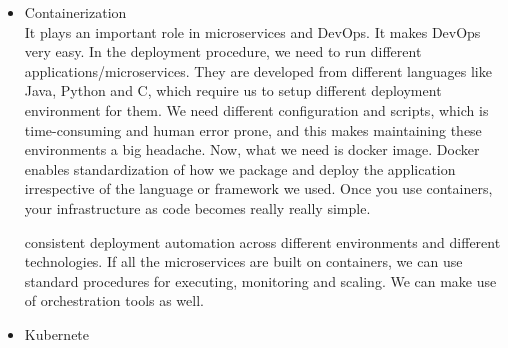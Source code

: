\documentclass{article}
\begin{document}
\begin{itemize}
\item Containerization\\
It plays an important role in microservices and DevOps. It makes DevOps very easy. In the deployment procedure, we need to run different applications/microservices. They are developed from different languages like Java, Python and C, which require us to setup different deployment environment for them. We need different configuration and scripts, which is time-consuming and human error prone, and this makes maintaining these environments a big headache. Now, what we need is docker image. Docker enables standardization of how we package and deploy the application irrespective of the language or framework we used. Once you use containers, your infrastructure as code becomes really really simple.

consistent deployment automation across different environments and different technologies. If all the microservices are built on containers, we can use standard procedures for executing, monitoring and scaling. We can make use of orchestration tools as well.
\item Kubernete\\


\end{itemize}
\end{document}
